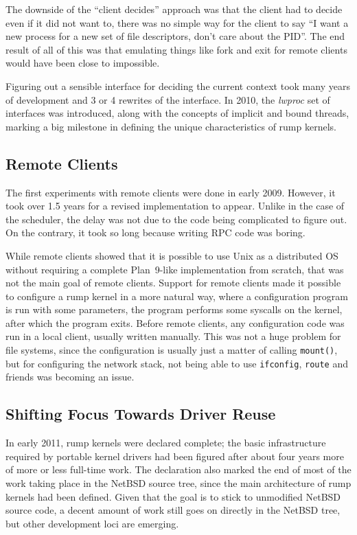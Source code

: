 The downside of the ``client decides'' approach was that the client
had to decide even if it did not want to, \ie there was no simple way
for the client to say ``I want a new process for a new set of file
descriptors, don't care about the PID''.  The end result of all of this
was that emulating things like fork and exit for remote clients would
have been close to impossible.

Figuring out a sensible interface for deciding the current context
took many years of development and 3 or 4 rewrites of the interface.
In 2010, the \textit{lwproc} set of interfaces was introduced, along with
the concepts of implicit and bound threads, marking a big milestone in
defining the unique characteristics of rump kernels.


\subsection{Remote Clients}

The first experiments with remote clients were done in early 2009.
However, it took over 1.5 years for a revised implementation to appear.
Unlike in the case of the scheduler, the delay was not due to the code
being complicated to figure out.  On the contrary, it took so long
because writing RPC code was boring.

While remote clients showed that it is possible to use Unix as a
distributed OS without requiring a complete Plan~9-like implementation
from scratch, that was not the main goal of remote clients.  Support for
remote clients made it possible to configure a rump kernel in a more
natural way, where a configuration program is run with some parameters,
the program performs some syscalls on the kernel, after which the program
exits.  Before remote clients, any configuration code was run in a local
client, usually written manually.  This was not a huge problem for
file systems, since the configuration is usually just a matter of
calling \verb+mount()+, but for configuring the network stack, not being
able to use \texttt{ifconfig}, \texttt{route} and friends was becoming
an issue.


\subsection{Shifting Focus Towards Driver Reuse}

In early 2011, rump kernels were declared complete; the basic
infrastructure required by portable kernel drivers had been figured after
about four years more of more or less full-time work.  The declaration
also marked the end of most of the work taking place in the NetBSD source
tree, since the main architecture of rump kernels had been defined.
Given that the goal is to stick to unmodified NetBSD source code,
a decent amount of work still goes on directly in the NetBSD tree,
but other development loci are emerging.

